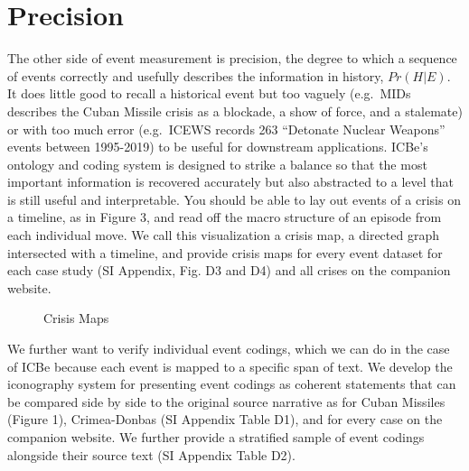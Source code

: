 \documentclass[9pt,twocolumn,twoside,lineno]{pnas-new}
\begin{document}
\hypertarget{precision}{%
\section*{Precision}\label{precision}}

The other side of event measurement is precision, the degree to which a
sequence of events correctly and usefully describes the information in
history, \(Pr(H|E)\). It does little good to recall a historical event
but too vaguely (e.g.~MIDs describes the Cuban Missile crisis as a
blockade, a show of force, and a stalemate) or with too much error
(e.g.~ICEWS records 263 ``Detonate Nuclear Weapons'' events between
1995-2019) to be useful for downstream applications. ICBe's ontology and
coding system is designed to strike a balance so that the most important
information is recovered accurately but also abstracted to a level that
is still useful and interpretable. You should be able to lay out events
of a crisis on a timeline, as in Figure 3, and read off the macro
structure of an episode from each individual move. We call this
visualization a crisis map, a directed graph intersected with a
timeline, and provide crisis maps for every event dataset for each case
study (SI Appendix, Fig. D3 and D4) and all crises on the companion
website.



\begin{figure}
\caption{Crisis Maps  \label{fig:p_precision_combined}}
\end{figure}


We further want to verify individual event codings, which we can do in
the case of ICBe because each event is mapped to a specific span of
text. We develop the iconography system for presenting event codings as
coherent statements that can be compared side by side to the original
source narrative as for Cuban Missiles (Figure 1), Crimea-Donbas (SI
Appendix Table D1), and for every case on the companion website. We
further provide a stratified sample of event codings alongside their
source text (SI Appendix Table D2).
\end{document}
